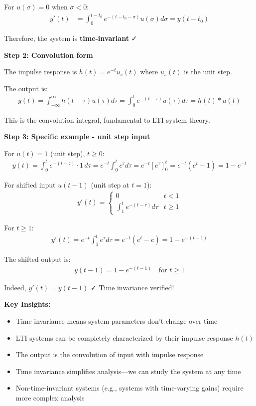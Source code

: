 \documentclass[11pt,a4paper]{article}
\begin{document}
For $u(\sigma) = 0$ when $\sigma < 0$:
\begin{align}
  y'(t) &= \int_0^{t-t_0} e^{-(t-t_0-\sigma)} u(\sigma) d\sigma = y(t-t_0)
\end{align}

Therefore, the system is \textbf{time-invariant} ✓

\textbf{Step 2: Convolution form}

The impulse response is $h(t) = e^{-t}u_s(t)$ where $u_s(t)$ is the unit step.

The output is:
\begin{align}
  y(t) = \int_{-\infty}^{\infty} h(t-\tau)u(\tau) d\tau = \int_0^t e^{-(t-\tau)} u(\tau) d\tau = h(t) * u(t)
\end{align}

This is the convolution integral, fundamental to LTI system theory.

\textbf{Step 3: Specific example - unit step input}

For $u(t) = 1$ (unit step), $t \geq 0$:
\begin{align}
  y(t) = \int_0^t e^{-(t-\tau)} \cdot 1\, d\tau = e^{-t} \int_0^t e^{\tau} d\tau = e^{-t}[e^{\tau}]_0^t = e^{-t}(e^t - 1) = 1 - e^{-t}
\end{align}

For shifted input $u(t - 1)$ (unit step at $t = 1$):
\begin{align}
  y'(t) = \begin{cases}
    0 & t < 1 \\
    \int_1^t e^{-(t-\tau)} d\tau & t \geq 1
  \end{cases}
\end{align}

For $t \geq 1$:
\begin{align}
  y'(t) = e^{-t}\int_1^t e^{\tau} d\tau = e^{-t}(e^t - e) = 1 - e^{-(t-1)}
\end{align}

The shifted output is:
\begin{align}
  y(t-1) = 1 - e^{-(t-1)} \quad \text{for } t \geq 1
\end{align}

Indeed, $y'(t) = y(t-1)$ ✓ Time invariance verified!

\textbf{Key Insights:}
\begin{itemize}
  \item Time invariance means system parameters don't change over time
  \item LTI systems can be completely characterized by their impulse response $h(t)$
  \item The output is the convolution of input with impulse response
  \item Time invariance simplifies analysis—we can study the system at any time
  \item Non-time-invariant systems (e.g., systems with time-varying gains) require more complex analysis
\end{itemize}
\end{document}
